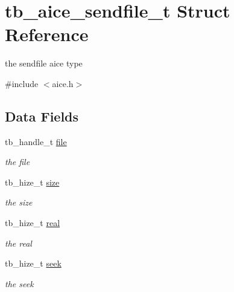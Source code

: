 \hypertarget{structtb__aice__sendfile__t}{\section{tb\-\_\-aice\-\_\-sendfile\-\_\-t Struct Reference}
\label{da/dc5/structtb__aice__sendfile__t}
}


the sendfile aice type  




{\ttfamily \#include $<$aice.\-h$>$}

\subsection*{Data Fields}
\begin{DoxyCompactItemize}
\item 
\hypertarget{structtb__aice__sendfile__t_a0d087087adc904f9d2d65b7b0d92beec}{tb\-\_\-handle\-\_\-t \hyperlink{structtb__aice__sendfile__t_a0d087087adc904f9d2d65b7b0d92beec}{file}}\label{da/dc5/structtb__aice__sendfile__t_a0d087087adc904f9d2d65b7b0d92beec}

\begin{DoxyCompactList}\small\item\em the file \end{DoxyCompactList}\item 
\hypertarget{structtb__aice__sendfile__t_a129b20542dd8155f4727ca7a344059a2}{tb\-\_\-hize\-\_\-t \hyperlink{structtb__aice__sendfile__t_a129b20542dd8155f4727ca7a344059a2}{size}}\label{da/dc5/structtb__aice__sendfile__t_a129b20542dd8155f4727ca7a344059a2}

\begin{DoxyCompactList}\small\item\em the size \end{DoxyCompactList}\item 
\hypertarget{structtb__aice__sendfile__t_ac3e215844db29870c911df0f3db2197f}{tb\-\_\-hize\-\_\-t \hyperlink{structtb__aice__sendfile__t_ac3e215844db29870c911df0f3db2197f}{real}}\label{da/dc5/structtb__aice__sendfile__t_ac3e215844db29870c911df0f3db2197f}

\begin{DoxyCompactList}\small\item\em the real \end{DoxyCompactList}\item 
\hypertarget{structtb__aice__sendfile__t_a576c019cc93b3355695bdbe7da7b2e89}{tb\-\_\-hize\-\_\-t \hyperlink{structtb__aice__sendfile__t_a576c019cc93b3355695bdbe7da7b2e89}{seek}}\label{da/dc5/structtb__aice__sendfile__t_a576c019cc93b3355695bdbe7da7b2e89}

\begin{DoxyCompactList}\small\item\em the seek \end{DoxyCompactList}\end{DoxyCompactItemize}


